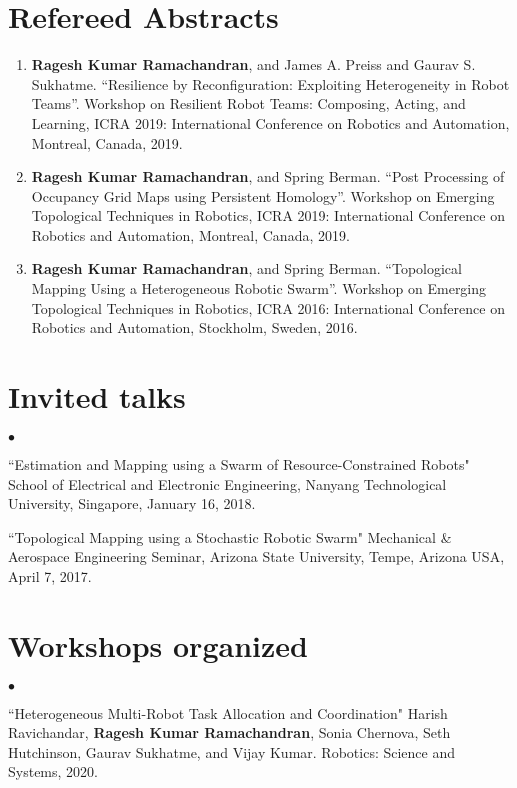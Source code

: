 \documentclass[margin,line]{res}
\newenvironment{list2}{
  \begin{list}{$\bullet$}{%
      \setlength{\itemsep}{0in}
      \setlength{\parsep}{0in} \setlength{\parskip}{0in}
      \setlength{\topsep}{0in} \setlength{\partopsep}{0in} 
      \setlength{\leftmargin}{0.2in}}}{\end{list}}
\begin{document}
\begin{resume}

\section{\sc Refereed Abstracts}
\begin{enumerate}
	\item \textbf{Ragesh Kumar Ramachandran}, and James A. Preiss and Gaurav S. Sukhatme. ``Resilience by Reconfiguration: Exploiting Heterogeneity in Robot Teams''. Workshop on Resilient Robot Teams:	Composing, Acting, and Learning, ICRA 2019: International Conference on Robotics and Automation, Montreal, Canada, 2019.
	
	\item \textbf{Ragesh Kumar Ramachandran}, and Spring Berman. ``Post Processing of Occupancy Grid Maps using Persistent Homology''. Workshop on Emerging Topological Techniques in Robotics, ICRA 2019: International Conference on Robotics and Automation, Montreal, Canada, 2019.
	
	\item \textbf{Ragesh Kumar Ramachandran}, and Spring Berman. ``Topological Mapping Using a Heterogeneous Robotic Swarm''. Workshop on Emerging Topological Techniques in Robotics, ICRA 2016: International Conference on Robotics and Automation, Stockholm, Sweden, 2016.  
\end{enumerate}
\section{\sc Invited talks}
\begin{list2}
	\item ``Estimation and Mapping using a Swarm of Resource-Constrained Robots" School of Electrical and Electronic Engineering, Nanyang Technological University, Singapore, January 16, 2018.
	\item ``Topological Mapping using a Stochastic Robotic Swarm" Mechanical \& Aerospace Engineering Seminar, Arizona State University, Tempe, Arizona USA, April 7, 2017.
\end{list2}

\section{\sc Workshops organized}
\begin{list2}
	\item ``Heterogeneous Multi-Robot Task Allocation and Coordination" Harish Ravichandar, \textbf{Ragesh Kumar Ramachandran}, Sonia Chernova, Seth Hutchinson, Gaurav Sukhatme, and Vijay Kumar. Robotics: Science and Systems, 2020.
\end{list2}


\end{resume}
\end{document}
